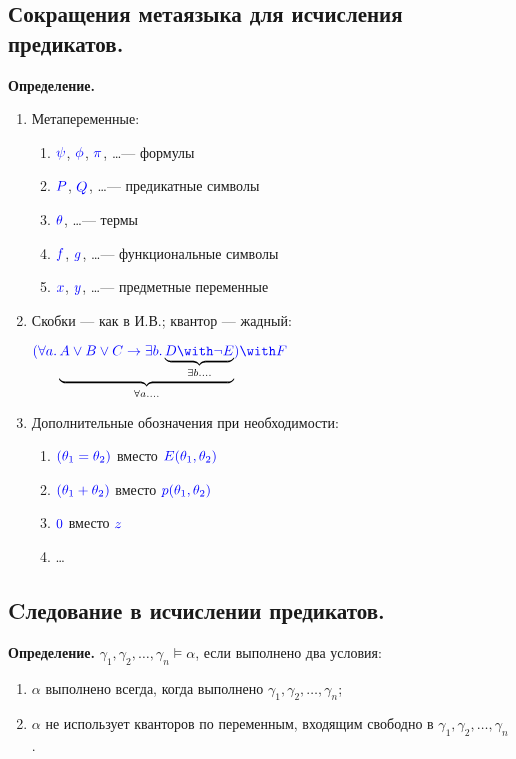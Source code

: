 \documentclass[10pt,a4paper,oneside]{article}
\begin{document}
\subsection{Сокращения метаязыка для исчисления предикатов.}

\noindent \textbf{ Определение. }
\begin{enumerate}
  \item Метапеременные:
  \begin{enumerate}
  \item $\color{blue}\psi$, $\color{blue}\phi$, $\color{blue}\pi$, \dots --- формулы
  \item $\color{blue}P$, $\color{blue}Q$, \dots --- предикатные символы
  \item $\color{blue}\theta$, \dots --- термы
  \item $\color{blue}f$, $\color{blue}g$, \dots --- функциональные символы
  \item $\color{blue}x$, $\color{blue}y$, \dots --- предметные переменные
  \end{enumerate}
  
  \item Скобки --- как в И.В.; квантор --- жадный:
  \begin{center}${\color{blue}(\forall a.} \underbrace{{\color{blue}A \vee B \vee C \rightarrow \exists b.}
                      \underbrace{\color{blue}D \with \neg E}_{\exists b.\dots}}_{\forall a.\dots} \color{blue}) \with F$\end{center}
  
  
  \item Дополнительные обозначения при необходимости:
  \begin{enumerate}
  \item $\color{blue}(\theta_1 = \theta_2)$ вместо $\color{blue}E(\theta_1,\theta_2)$
  \item $\color{blue}(\theta_1 + \theta_2)$ вместо $\color{blue}p(\theta_1,\theta_2)$
  \item $\color{blue}0$ вместо $\color{blue}z$
  \item \dots
  \end{enumerate}
  
  \end{enumerate}

\subsection{Cледование в исчислении предикатов.}
\noindent \textbf{ Определение. }
$\gamma_1,\gamma_2,\dots,\gamma_n\models\alpha$, если выполнено два условия:
\begin{enumerate}
\item $\alpha$ выполнено всегда, когда выполнено $\gamma_1,\gamma_2,\dots,\gamma_n$;
\item $\alpha$ не использует кванторов по переменным, входящим свободно в $\gamma_1,\gamma_2,\dots,\gamma_n$.
\end{enumerate}
\end{document}

